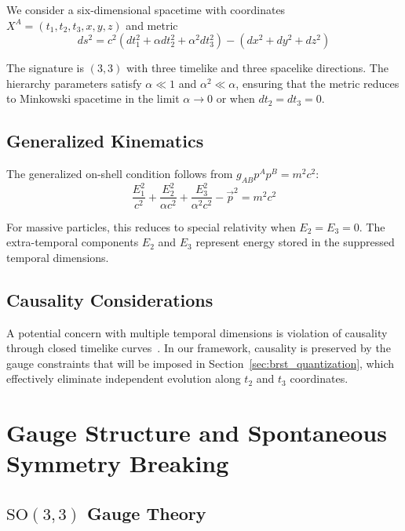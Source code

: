 \documentclass[12pt,a4paper]{article}
\newcommand{\SO}{\text{SO}}
\begin{document}
We consider a six-dimensional spacetime with coordinates $X^A = (t_1, t_2, t_3, x, y, z)$ and metric
\begin{equation}
ds^2 = c^2\left(dt_1^2 + \alpha dt_2^2 + \alpha^2 dt_3^2\right) - \left(dx^2 + dy^2 + dz^2\right)
\label{eq:6d_metric}
\end{equation}

The signature is $(3,3)$ with three timelike and three spacelike directions. The hierarchy parameters satisfy $\alpha \ll 1$ and $\alpha^2 \ll \alpha$, ensuring that the metric reduces to Minkowski spacetime in the limit $\alpha \to 0$ or when $dt_2 = dt_3 = 0$.

\subsection{Generalized Kinematics}

The generalized on-shell condition follows from $g_{AB}p^Ap^B = m^2c^2$:
\begin{equation}
\frac{E_1^2}{c^2} + \frac{E_2^2}{\alpha c^2} + \frac{E_3^2}{\alpha^2 c^2} - \vec{p}^2 = m^2c^2
\label{eq:dispersion}
\end{equation}

For massive particles, this reduces to special relativity when $E_2 = E_3 = 0$. The extra-temporal components $E_2$ and $E_3$ represent energy stored in the suppressed temporal dimensions.

\subsection{Causality Considerations}

A potential concern with multiple temporal dimensions is violation of causality through closed timelike curves~\cite{tegmark1997}. In our framework, causality is preserved by the gauge constraints that will be imposed in Section~\ref{sec:brst_quantization}, which effectively eliminate independent evolution along $t_2$ and $t_3$ coordinates.

\section{Gauge Structure and Spontaneous Symmetry Breaking}
\label{sec:gauge_structure}

\subsection{$\SO(3,3)$ Gauge Theory}
\end{document}

